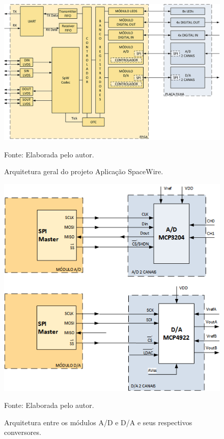 \begin{figure}[!htb]
	\centering
	\caption{Arquitetura geral do projeto Aplicação SpaceWire.}
	\includegraphics[scale = 1.85]{Imagens/Arch_ApSpW}
	
	Fonte: Elaborada pelo autor.
	
	\label{Arch_ApSpW}
\end{figure}

\begin{figure}[!htb]
	\centering
	\caption{Arquitetura entre os módulos A/D e D/A e seus respectivos conversores.}
	\includegraphics[scale = 0.9]{Imagens/Arch_conversores}
	
	Fonte: Elaborada pelo autor.
	
	\label{Arch_conversores}
\end{figure}

